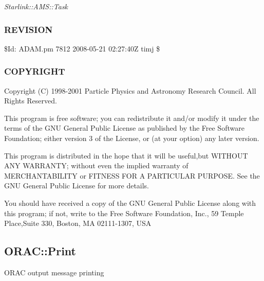 \begin{description}
\emph{Starlink::AMS::Task}

\subsubsection*{REVISION\label{ORAC::Msg::Task::ADAM_REVISION}}


\$Id: ADAM.pm 7812 2008-05-21 02:27:40Z timj \$

\subsubsection*{COPYRIGHT\label{ORAC::Msg::Task::ADAM_COPYRIGHT}}


Copyright (C) 1998-2001 Particle Physics and Astronomy Research
Council. All Rights Reserved.



This program is free software; you can redistribute it and/or modify it under
the terms of the GNU General Public License as published by the Free Software
Foundation; either version 3 of the License, or (at your option) any later
version.



This program is distributed in the hope that it will be useful,but WITHOUT ANY
WARRANTY; without even the implied warranty of MERCHANTABILITY or FITNESS FOR A
PARTICULAR PURPOSE. See the GNU General Public License for more details.



You should have received a copy of the GNU General Public License along with
this program; if not, write to the Free Software Foundation, Inc., 59 Temple
Place,Suite 330, Boston, MA  02111-1307, USA

\subsection{ORAC::Print\label{ORAC::Print}}


ORAC output message printing


\end{description}
